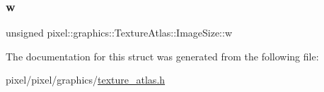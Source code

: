 \mbox{\label{structpixel_1_1graphics_1_1_texture_atlas_1_1_image_size_ab18fd4d83eff405c3cba204b1ea4ce36}} 
\subsubsection{\texorpdfstring{w}{w}}
{\footnotesize\ttfamily unsigned pixel\+::graphics\+::\+Texture\+Atlas\+::\+Image\+Size\+::w}



The documentation for this struct was generated from the following file\+:\begin{DoxyCompactItemize}
\item 
pixel/pixel/graphics/\hyperlink{texture__atlas_8h}{texture\+\_\+atlas.\+h}\end{DoxyCompactItemize}
